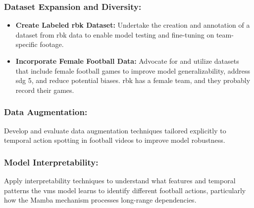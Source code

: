 \subsubsection{Dataset Expansion and Diversity:}
    \begin{itemize}
        \item \textbf{Create Labeled \acrfull{rbk} Dataset:} Undertake the creation and annotation of a dataset from \acrshort{rbk} data to enable model testing and fine-tuning on team-specific footage.
        \item \textbf{Incorporate Female Football Data:} Advocate for and utilize datasets that include female football games to improve model generalizability, address \acrshort{sdg} 5, and reduce potential biases. \acrshort{rbk} has a female team, and they probably record their games. 
    \end{itemize}
    
\subsubsection{Data Augmentation:} Develop and evaluate data augmentation techniques tailored explicitly to temporal action spotting in football videos to improve model robustness.

\subsubsection{Model Interpretability:} Apply interpretability techniques to understand what features and temporal patterns the \acrshort{vms} model learns to identify different football actions, particularly how the Mamba mechanism processes long-range dependencies.
